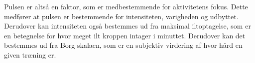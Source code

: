 Pulsen er altså en faktor, som er medbestemmende for aktivitetens fokus. Dette medfører at pulsen er bestemmende for intensiteten, varigheden og udbyttet. Derudover kan intensiteten også bestemmes ud fra maksimal iltoptagelse, som er en betegnelse for hvor meget ilt kroppen intager i minuttet. Derudover kan det bestemmes ud fra Borg skalaen, som er en subjektiv virdering af hvor hård en given træning er. \citep{Kiens2007}





